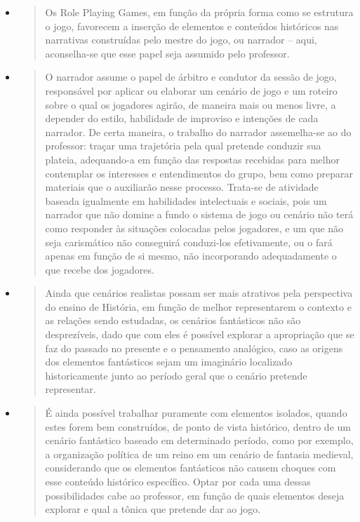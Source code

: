 \documentclass[12pt]{extarticle}
\begin{document}
\begin{itemize}
\item
  \begin{quote}
  Os Role Playing Games, em função da própria forma como se estrutura o
  jogo, favorecem a inserção de elementos e conteúdos históricos nas
  narrativas construídas pelo mestre do jogo, ou narrador -- aqui,
  aconselha-se que esse papel seja assumido pelo professor.
  \end{quote}
\item
  \begin{quote}
  O narrador assume o papel de árbitro e condutor da sessão de jogo,
  responsável por aplicar ou elaborar um cenário de jogo e um roteiro
  sobre o qual os jogadores agirão, de maneira mais ou menos livre, a
  depender do estilo, habilidade de improviso e intenções de cada
  narrador. De certa maneira, o trabalho do narrador assemelha-se ao do
  professor: traçar uma trajetória pela qual pretende conduzir sua
  plateia, adequando-a em função das respostas recebidas para melhor
  contemplar os interesses e entendimentos do grupo, bem como preparar
  materiais que o auxiliarão nesse processo. Trata-se de atividade
  baseada igualmente em habilidades intelectuais e sociais, pois um
  narrador que não domine a fundo o sistema de jogo ou cenário não terá
  como responder às situações colocadas pelos jogadores, e um que não
  seja carismático não conseguirá conduzi-los efetivamente, ou o fará
  apenas em função de si mesmo, não incorporando adequadamente o que
  recebe dos jogadores.
  \end{quote}
\item
  \begin{quote}
  Ainda que cenários realistas possam ser mais atrativos pela
  perspectiva do ensino de História, em função de melhor representarem o
  contexto e as relações sendo estudadas, os cenários fantásticos não
  são desprezíveis, dado que com eles é possível explorar a apropriação
  que se faz do passado no presente e o pensamento analógico, caso as
  origens dos elementos fantásticos sejam um imaginário localizado
  historicamente junto ao período geral que o cenário pretende
  representar.
  \end{quote}
\item
  \begin{quote}
  É ainda possível trabalhar puramente com elementos isolados, quando
  estes forem bem construídos, de ponto de vista histórico, dentro de um
  cenário fantástico baseado em determinado período, como por exemplo, a
  organização política de um reino em um cenário de fantasia medieval,
  considerando que os elementos fantásticos não causem choques com esse
  conteúdo histórico específico. Optar por cada uma dessas
  possibilidades cabe ao professor, em função de quais elementos deseja
  explorar e qual a tônica que pretende dar ao jogo.
  \end{quote}
\end{itemize}
\end{document}
